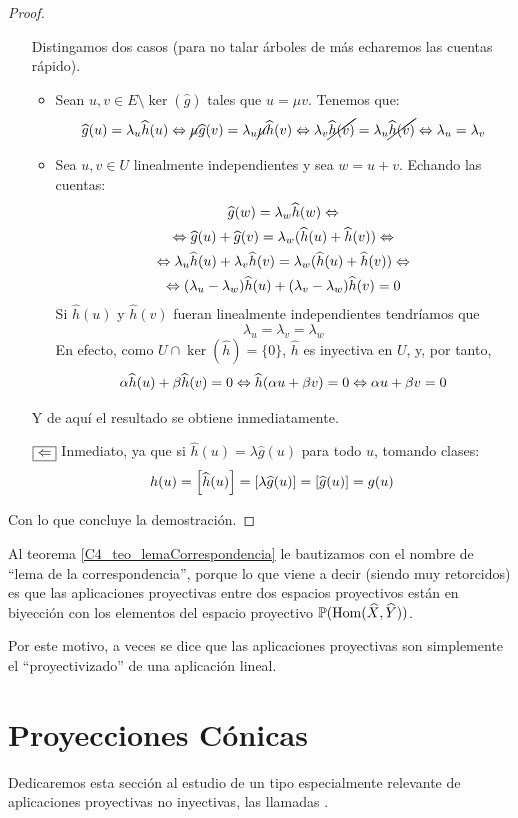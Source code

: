 \begin{proof}
\begin{itemize}
		Distingamos dos casos (para no talar árboles de más echaremos las cuentas rápido).
		\begin{itemize}
			\item Sean $u,v\in E\setminus\ker(\widehat{g})$ tales que $u=\mu v$. Tenemos que:
			\[
			\widehat{g}(u)=\lambda_u\widehat{h}(u)
			\Leftrightarrow\cancel{\mu}\widehat{g}(v)=\lambda_u\cancel{\mu}\widehat{h}(v)\Leftrightarrow\lambda_v\cancel{\widehat{h}(v)}=\lambda_u\cancel{\widehat{h}(v)}\Leftrightarrow\lambda_u=\lambda_v
			\]
			\item Sea $u,v\in U$ linealmente independientes y sea $w=u+v$. Echando las cuentas:
			\begin{multline}\widehat{g}(w)=\lambda_w\widehat{h}(w)\Leftrightarrow\\\Leftrightarrow\widehat{g}(u)+\widehat{g}(v)=\lambda_w(\widehat{h}(u)+\widehat{h}(v))\Leftrightarrow\\
			\Leftrightarrow \lambda_u\widehat{h}(u)+\lambda_v\widehat{h}(v)=\lambda_w(\widehat{h}(u)+\widehat{h}(v))\Leftrightarrow\\
			\Leftrightarrow(\lambda_u-\lambda_w)\widehat{h}(u)+(\lambda_v-\lambda_w)\widehat{h}(v)=0\end{multline}
			Si $\widehat{h}(u)$ y $\widehat{h}(v)$ fueran linealmente independientes tendríamos que \[\lambda_u=\lambda_v=\lambda_w\]
			En efecto, como $U\cap\ker(\widehat{h})=\{0\}$, $\widehat{h}$ es inyectiva en $U$, y, por tanto,
			\[\alpha\widehat{h}(u)+\beta\widehat{h}(v)=0\Leftrightarrow \widehat{h}(\alpha u +\beta v)=0\Leftrightarrow \alpha u +\beta v=0\]
		\end{itemize}
		Y de aquí el resultado se obtiene inmediatamente.
		\item[$\fbox{$\Leftarrow$}$] Inmediato, ya que si $\widehat{h}(u)=\lambda\widehat{g}(u)$ para todo $u$, tomando clases:
		\[h(u)=\left [ \widehat{h}(u) \right ]=\left [ \lambda\widehat{g}(u) \right ]=\left [ \widehat{g}(u) \right ]=g(u)\]
	\end{itemize}
	Con lo que concluye la demostración.
\end{proof}
Al teorema \ref{C4_teo_lemaCorrespondencia} le bautizamos con el nombre de ``lema de la correspondencia'', porque lo que viene a decir (siendo muy retorcidos) es que las aplicaciones proyectivas entre dos espacios proyectivos están en biyección con los elementos del espacio proyectivo $\mathbb{P}(\mathrm{Hom}(\widehat{X},\widehat{Y}))$.

Por este motivo, a veces se dice que las aplicaciones proyectivas son simplemente el ``proyectivizado'' de una aplicación lineal.
\section{Proyecciones Cónicas}
\label{C4_proyeccionesConicas}
Dedicaremos esta sección al estudio de un tipo especialmente relevante de aplicaciones proyectivas no inyectivas, las llamadas .

